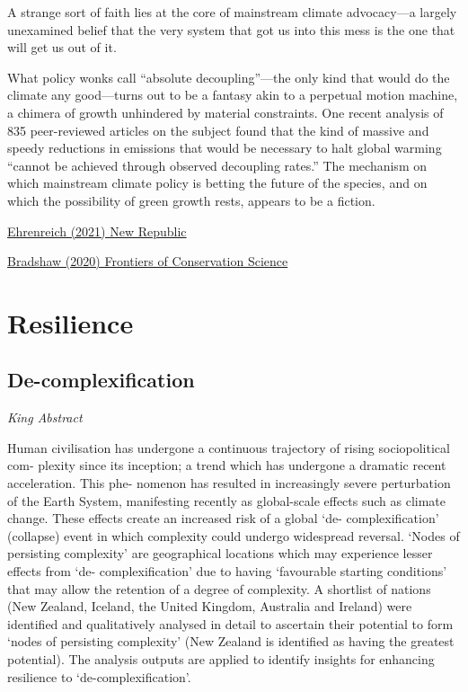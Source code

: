 \documentclass[
]{book}
\begin{document}
A strange sort of faith lies at the core of mainstream climate advocacy---a largely unexamined belief that the very system that got us into this mess is the one that will get us out of it.

What policy wonks call ``absolute decoupling''---the only kind that would do the climate any good---turns out to be a fantasy akin to a perpetual motion machine, a chimera of growth unhindered by material constraints. One recent analysis of 835 peer-reviewed articles on the subject found that the kind of massive and speedy reductions in emissions that would be necessary to halt global warming ``cannot be achieved through observed decoupling rates.'' The mechanism on which mainstream climate policy is betting the future of the species, and on which the possibility of green growth rests, appears to be a fiction.

\href{https://newrepublic.com/article/161575/climate-change-effects-hurtling-toward-global-suicide}{Ehrenreich (2021) New Republic}

\href{https://www.frontiersin.org/articles/10.3389/fcosc.2020.615419/full}{Bradshaw (2020) Frontiers of Conservation Science}

\hypertarget{resilience}{%
\chapter{Resilience}\label{resilience}}

\hypertarget{de-complexification}{%
\section{De-complexification}\label{de-complexification}}

\emph{King Abstract}

Human civilisation has undergone a continuous trajectory of rising sociopolitical com-
plexity since its inception; a trend which has undergone a dramatic recent acceleration. This phe-
nomenon has resulted in increasingly severe perturbation of the Earth System, manifesting recently
as global-scale effects such as climate change. These effects create an increased risk of a global `de-
complexification' (collapse) event in which complexity could undergo widespread reversal. `Nodes
of persisting complexity' are geographical locations which may experience lesser effects from `de-
complexification' due to having `favourable starting conditions' that may allow the retention of a
degree of complexity. A shortlist of nations (New Zealand, Iceland, the United Kingdom, Australia
and Ireland) were identified and qualitatively analysed in detail to ascertain their potential to form
`nodes of persisting complexity' (New Zealand is identified as having the greatest potential). The
analysis outputs are applied to identify insights for enhancing resilience to `de-complexification'.
\end{document}
